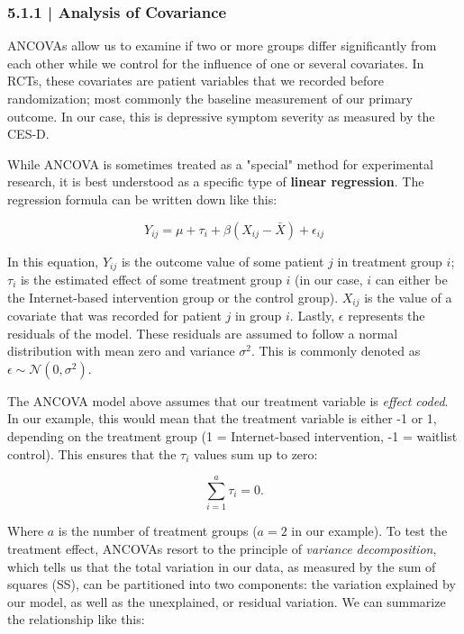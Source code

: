 \subsubsection{{\normalfont\textsf{\textcolor{sBlue}{\small 5.1.1 |}}} Analysis of Covariance}

ANCOVAs allow us to examine if two or more groups differ significantly from each other while we control for the influence of one or several covariates. In RCTs, these covariates are patient variables that we recorded before randomization; most commonly the baseline measurement of our primary outcome. In our case, this is depressive symptom severity as measured by the CES-D.

While ANCOVA is sometimes treated as a "special" method for experimental research, it is best understood as a specific type of \textbf{linear regression}. The regression formula can be written down like this:

\begin{equation}
    Y_{ij} = \mu + \tau_i + \beta (X_{ij}-\bar X) + \epsilon_{ij}
\end{equation}

In this equation, $Y_{ij}$ is the outcome value of some patient $j$ in treatment group $i$; $\tau_i$ is the estimated effect of some treatment group $i$ (in our case, $i$ can either be the Internet-based intervention group or the control group). $X_{ij}$ is the value of a covariate that was recorded for patient $j$ in group $i$. Lastly, $\epsilon$ represents the residuals of the model. These residuals are assumed to follow a normal distribution with mean zero and variance $\sigma^2$. This is commonly denoted as $\epsilon \sim \mathcal{N}(0, \sigma^2)$.

The ANCOVA model above assumes that our treatment variable is \emph{effect coded}. In our example, this would mean that the treatment variable is either -1 or 1, depending on the treatment group (1 = Internet-based intervention, -1 = waitlist control). This ensures that the $\tau_i$ values sum up to zero:

\begin{equation}
\sum^{a}_{i=1}\tau_i = 0.
\end{equation}

Where $a$ is the number of treatment groups ($a=2$ in our example). To test the treatment effect, ANCOVAs resort to the principle of \emph{variance decomposition}, which tells us that the total variation in our data, as measured by the sum of squares (SS), can be partitioned into two components: the variation explained by our model, as well as the unexplained, or residual variation. We can summarize the relationship like this:

